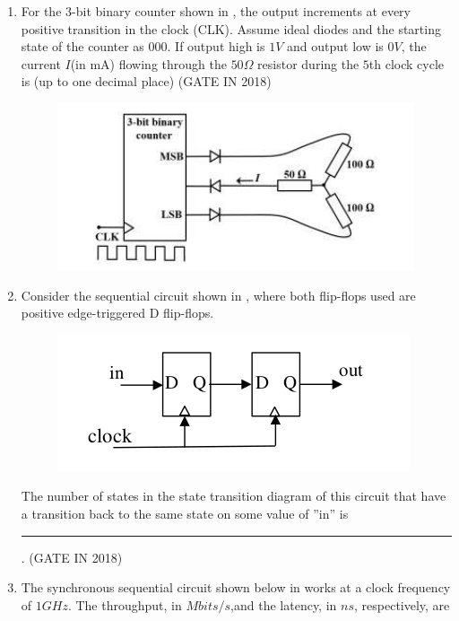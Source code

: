 \begin{enumerate}[label=\arabic*.,ref=\theenumi]
\item  
\label{prob:gate IN 17}
For the $3$-bit binary counter shown in 
, the output increments at every positive 
transition in the clock (CLK). Assume ideal diodes and the starting state of the counter as 
$000$. If output high is $1 V$ and output low is $0 V$, the current $I$(in mA) flowing through the 
$50 \Omega$ resistor during the $5$th clock cycle is (up to one decimal place)
\hfill(GATE IN 2018)
\begin{figure}[H]
\centering
\includegraphics[width=0.75\columnwidth]{ide/7474/figs/pic.png}
\caption{}
\label{fig:lcd}
\end{figure}
\item
\label{prob:gate CS 22}
Consider the sequential circuit shown in , where both flip-flops used are positive
    edge-triggered D flip-flops.
\begin{figure}[H]
        \centering      
        \includegraphics[width=0.75\columnwidth]{ide/7474/figs/wert.jpg}
        \caption{}    
        \label{fig:wert}
    \end{figure}
%
The number of states in the state transition diagram of this circuit that have a transition back to the same state on some value of ''in'' is \rule{30pt}{1pt}.
   \hfill(GATE IN 2018)
   \item The synchronous sequential circuit shown below 
in 
	   works at a clock frequency of $1 GHz$. The throughput, in $Mbits/s$,and the latency, in $ns$, respectively, are 
	\begin{figure}[H]
    \centering
\end{figure}
\end{enumerate}
